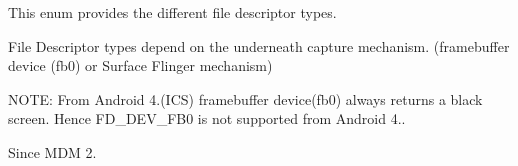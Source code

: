 \-This enum provides the different file descriptor types. 

\-File \-Descriptor types depend on the underneath capture mechanism. (framebuffer device (fb0) or \-Surface \-Flinger mechanism) \par


\-N\-O\-T\-E\-: \-From \-Android 4.(\-I\-C\-S) framebuffer device(fb0) always returns a black screen. \-Hence \-F\-D\-\_\-\-D\-E\-V\-\_\-\-F\-B0 is not supported from \-Android 4..

\begin{DoxySince}{\-Since}
\-M\-D\-M 2. 
\end{DoxySince}
